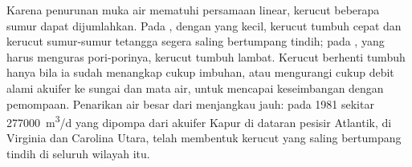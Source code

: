 Karena penurunan muka air mematuhi persamaan linear, kerucut beberapa sumur
dapat dijumlahkan. Pada , dengan  yang kecil, kerucut tumbuh cepat
dan kerucut sumur-sumur tetangga segera saling bertumpang tindih; pada ,
yang harus menguras pori-porinya, kerucut tumbuh lambat. Kerucut berhenti
tumbuh hanya bila ia sudah menangkap cukup imbuhan, atau mengurangi cukup
debit alami akuifer ke sungai dan mata air, untuk mencapai keseimbangan
dengan pemompaan. Penarikan air besar dari  menjangkau jauh: pada 1981
sekitar \qty{277000}{m^3/d} yang dipompa dari akuifer Kapur di dataran
pesisir Atlantik, di Virginia dan Carolina Utara, telah membentuk
kerucut yang saling bertumpang tindih di seluruh wilayah itu.

